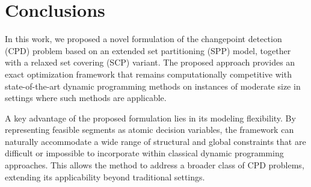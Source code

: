 \documentclass[preprints,article,submit,pdftex,moreauthors]{Definitions/mdpi}
\begin{document}


\section{Conclusions}              			\label{sec:conclusions}

In this work, we proposed a novel formulation of the changepoint detection (CPD) problem based on an extended set partitioning (SPP) model, together with a relaxed set covering (SCP) variant. The proposed approach provides an exact optimization framework that remains computationally competitive with state-of-the-art dynamic programming methods on instances of moderate size in settings where such methods are applicable.

A key advantage of the proposed formulation lies in its modeling flexibility. By representing feasible segments as atomic decision variables, the framework can naturally accommodate a wide range of structural and global constraints that are difficult or impossible to incorporate within classical dynamic programming approaches. This allows the method to address a broader class of CPD problems, extending its applicability beyond traditional settings.
\end{document}
